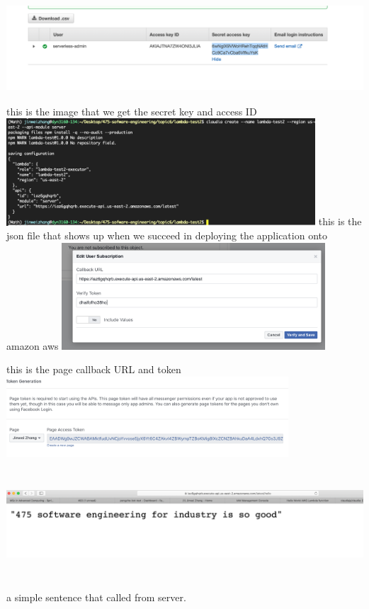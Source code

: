 \documentclass[11pt]{article}
\begin{document}
            \includegraphics[width=\textwidth,height = 4cm ]{keys.png}
            this is the image that we get the secret key and access ID \\
            \includegraphics[width=\textwidth,height = 4cm ]{deploy.png}
            this is the json file that shows up when we succeed in deploying the application onto amazon aws
            \includegraphics[width=\textwidth,height = 4cm ]{t.png}
            
            this is the page callback URL and token \\
            \includegraphics[width=\textwidth,height = 3cm ]{t2.png}
            
            \includegraphics[width=\textwidth,height = 4cm ]{res.png}
            
            a simple sentence that called from server. 
  
        
\end{document}
